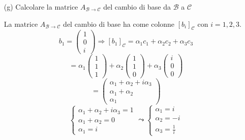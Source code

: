 \documentclass[a4paper]{article}
\theoremstyle{break}
\theoremstyle{break}
\theoremstyle{break}
\theoremstyle{break}
\begin{document}
\begin{enumerate}
	\item[(g)] Calcolare la matrice \( A_{\mathcal{B} \to \mathcal{C}} \) del cambio di base
	      da \( \mathcal{B} \) a \( \mathcal{C} \)

	      \vspace{1em}
	      La matrice \( A_{\mathcal{B} \to \mathcal{C}} \) del cambio di base ha come
	      colonne \( [b_i]_{\mathcal{C}} \) con \( i = 1, 2, 3 \).
	      \[
		      b_1 = \begin{pmatrix} 1 \\ 0 \\ i \end{pmatrix}
		      \Rightarrow
		      [b_1]_{\mathcal{C}} = \alpha_1 c_1 + \alpha_2 c_2 + \alpha_3 c_3
	      \]
	      \[
		      = \alpha_1 \begin{pmatrix} 1 \\ 1 \\ 1 \end{pmatrix} + \alpha_2 \begin{pmatrix} 1 \\ 1 \\ 0 \end{pmatrix} + \alpha_3 \begin{pmatrix} i \\ 0 \\ 0 \end{pmatrix}
	      \]
	      \[
		      = \begin{pmatrix}
			      \alpha_1 + \alpha_2 + i\alpha_3 \\
			      \alpha_1 + \alpha_2             \\
			      \alpha_1
		      \end{pmatrix}
	      \]
	      \[
		      \begin{cases}
			      \alpha_1 + \alpha_2 + i\alpha_3 = 1 \\
			      \alpha_1 + \alpha_2 = 0             \\
			      \alpha_1 = i
		      \end{cases}
		      \leadsto
		      \begin{cases}
			      \alpha_1 = i  \\
			      \alpha_2 = -i \\
			      \alpha_3 = \frac{1}{i}
		      \end{cases}
	      \]


\end{enumerate}
\end{document}
